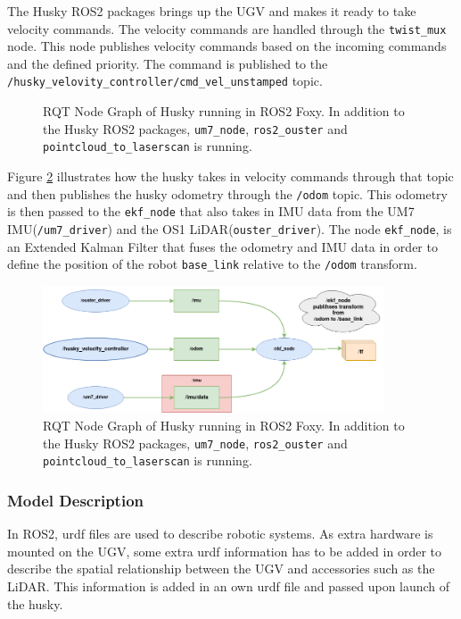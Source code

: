 The Husky ROS2 packages brings up the UGV and makes it ready to take velocity commands. The velocity commands are handled through the \lstinline{twist_mux} node. This node publishes velocity commands based on the incoming commands and the defined priority. The command is published to the \lstinline{/husky_velovity_controller/cmd_vel_unstamped} topic.

\begin{figure}[H]
  \centering
  
  \caption{RQT Node Graph of Husky running in ROS2 Foxy. In addition to the Husky ROS2 packages, \lstinline{um7_node}, \lstinline{ros2_ouster} and \lstinline{pointcloud_to_laserscan} is running.}
  \label{fig:rqt_husky}
\end{figure}

Figure \ref{fig:rqt_husky} illustrates how the husky takes in velocity commands through that topic and then publishes the husky odometry through the \lstinline{/odom} topic. This odometry is then passed to the \lstinline{ekf_node} that also takes in IMU data from the UM7 IMU(\lstinline{/um7_driver}) and the OS1 LiDAR(\lstinline{ouster_driver}). The node \lstinline{ekf_node}, is an Extended Kalman Filter that fuses the odometry and IMU data in order to define the position of the robot \lstinline{base_link} relative to the \lstinline{/odom} transform.

\begin{figure}[H]
  \centering
  \includegraphics[width = 0.9\textwidth]{Figures/husky_nodess.drawio.png}
  \caption{RQT Node Graph of Husky running in ROS2 Foxy. In addition to the Husky ROS2 packages, \lstinline{um7_node}, \lstinline{ros2_ouster} and \lstinline{pointcloud_to_laserscan} is running.}
  \label{fig:rqt_husky}
\end{figure}

\subsubsection{Model Description}
In ROS2, urdf files are used to describe robotic systems. As extra hardware is mounted on the UGV, some extra urdf information has to be added in order to describe the spatial relationship between the UGV and accessories such as the LiDAR. This information is added in an own urdf file and passed upon launch of the husky.

